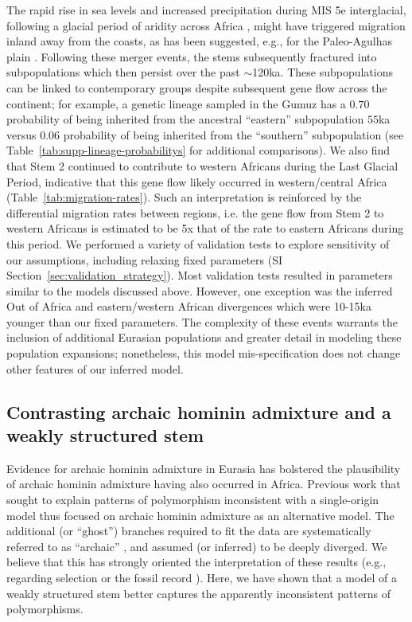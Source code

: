 \documentclass[]{article}
\begin{document}
The rapid rise in sea levels and increased precipitation during MIS
5e interglacial, following a glacial period of aridity across Africa
\citep{Blome2012-lw}, might have triggered migration inland away from the
coasts, as has been suggested, e.g., for the Paleo-Agulhas plain
\citep{Marean2014-pg}. Following these merger events, the stems subsequently fractured into
subpopulations which then persist over the past $\sim$120ka. These
subpopulations can be linked to contemporary groups despite subsequent gene
flow across the continent; for example, a genetic lineage sampled in the Gumuz
has a $0.70$ probability of being inherited from the ancestral ``eastern''
subpopulation $55$ka versus $0.06$ probability of being inherited
from the ``southern'' subpopulation (see Table~\ref{tab:supp-lineage-probabilitys} for
additional comparisons). We also find that Stem 2 continued to contribute to
western Africans during the Last Glacial Period, indicative that this gene flow
likely occurred in western/central Africa (Table~\ref{tab:migration-rates}).
Such an interpretation is reinforced by the differential migration rates
between regions, i.e. the gene flow from Stem 2 to western Africans is estimated to be 5x that
of the rate to eastern Africans during this period. We performed a variety of
validation tests to explore sensitivity of our assumptions, including relaxing
fixed parameters (SI Section~\ref{sec:validation_strategy}). Most validation
tests resulted in parameters similar to the models discussed above. However,
one exception was the inferred Out of Africa and eastern/western African
divergences which were 10-15ka younger than our fixed parameters. The complexity of
these events warrants the inclusion of additional Eurasian populations and
greater detail in modeling these population expansions; nonetheless, this model
mis-specification does not change other features of our inferred model.

\subsection*{Contrasting archaic hominin admixture and a weakly structured stem}

Evidence for archaic hominin admixture in Eurasia has bolstered the
plausibility of archaic hominin admixture having also occurred in Africa.
Previous work that sought to explain patterns of polymorphism inconsistent with
a single-origin model thus focused on archaic hominin admixture as an
alternative model. The additional (or ``ghost'') branches required to fit the
data are systematically referred to as ``archaic''
\citep{Plagnol2006-lt,Hammer2011-bx,Hey2018-pw,Ragsdale2019-nt,
Lorente-Galdos2019-vz,Durvasula2020-td}, and assumed (or inferred) to be deeply
diverged. We believe that this has strongly oriented the interpretation of
these results (e.g., regarding selection \cite{Wall2019-ao} or the fossil
record \cite{Grun2020-su}). Here, we have shown that a model of a weakly
structured stem better captures the apparently inconsistent patterns of
polymorphisms.
\end{document}
